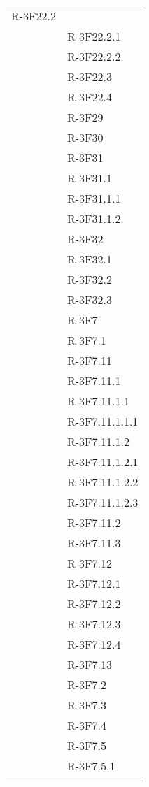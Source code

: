 \begin{longtable}{l p{3cm}}
R-3F22.2 \tabularnewline &

R-3F22.2.1 \tabularnewline &

R-3F22.2.2 \tabularnewline &

R-3F22.3 \tabularnewline &

R-3F22.4 \tabularnewline &

R-3F29 \tabularnewline &

R-3F30 \tabularnewline &

R-3F31 \tabularnewline &

R-3F31.1 \tabularnewline &

R-3F31.1.1 \tabularnewline &

R-3F31.1.2 \tabularnewline &

R-3F32 \tabularnewline &

R-3F32.1 \tabularnewline &

R-3F32.2 \tabularnewline &

R-3F32.3 \tabularnewline &

R-3F7 \tabularnewline &

R-3F7.1 \tabularnewline &

R-3F7.11 \tabularnewline &

R-3F7.11.1 \tabularnewline &

R-3F7.11.1.1 \tabularnewline &

R-3F7.11.1.1.1 \tabularnewline &

R-3F7.11.1.2 \tabularnewline &

R-3F7.11.1.2.1 \tabularnewline &

R-3F7.11.1.2.2 \tabularnewline &

R-3F7.11.1.2.3 \tabularnewline &

R-3F7.11.2 \tabularnewline &

R-3F7.11.3 \tabularnewline &

R-3F7.12 \tabularnewline &

R-3F7.12.1 \tabularnewline &

R-3F7.12.2 \tabularnewline &

R-3F7.12.3 \tabularnewline &

R-3F7.12.4 \tabularnewline &

R-3F7.13 \tabularnewline &

R-3F7.2 \tabularnewline &

R-3F7.3 \tabularnewline &

R-3F7.4 \tabularnewline &

R-3F7.5 \tabularnewline &

R-3F7.5.1 \tabularnewline &


\end{longtable}
